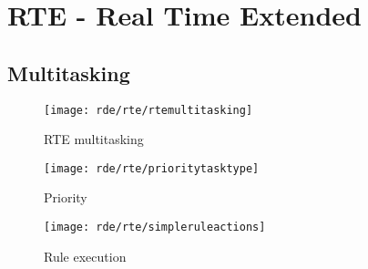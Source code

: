 

\chapter{RTE - Real Time Extended}

\section{Multitasking}

\begin{figure}
	\centering\texttt{[image: rde/rte/rtemultitasking]}
	\caption{RTE multitasking}
	\label{rtemultitasking}
\end{figure}

\begin{figure}
	\centering\texttt{[image: rde/rte/prioritytasktype]}
	\caption{Priority}
	\label{prioritytasktype}
\end{figure}

\begin{figure}
	\centering\texttt{[image: rde/rte/simpleruleactions]}
	\caption{Rule execution}
	\label{simpleruleactions}
\end{figure}